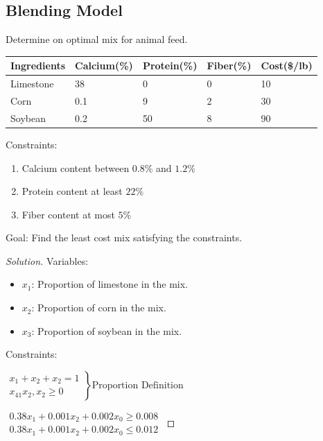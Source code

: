 \documentclass[11pt]{article}
\numberwithin{equation}{section}
\newenvironment{solution}
  {\renewcommand\qedsymbol{$\blacksquare$}\begin{proof}[Solution]}
  {\end{proof}}
\begin{document}
\subsection{Blending Model}
\begin{example}
    Determine on optimal mix for animal feed.

    \vspace{5mm}
    \begin{tabular}{|l|llll|}
        \hline
        Ingredients & Calcium(\%) & Protein(\%) & Fiber(\%) & Cost(\$/lb) \\ \hline
        Limestone   & 38          & 0           & 0         & 10          \\
        Corn        & 0.1         & 9           & 2         & 30          \\
        Soybean     & 0.2         & 50          & 8         & 90          \\ \hline
    \end{tabular}
    \vspace{5mm}
    
    Constraints:
    \begin{enumerate}[1)]
        \item Calcium content between $0.8\%$ and $1.2\%$
        \item Protein content at least $22\%$
        \item Fiber content at most $5\%$
    \end{enumerate}
    Goal: Find the least cost mix satisfying the constraints.

    \begin{solution}
        Variables:
        \begin{itemize}
            \item $x_1$: Proportion of limestone in the mix.
            \item $x_2$: Proportion of corn in the mix.
            \item $x_3$: Proportion of soybean in the mix.
        \end{itemize}
        Constraints:

        $\left.\begin{array}{l}
            x_{1}+x_{2}+x_{2}=1 \\
            x_{41} x_{2}, x_{2} \geqslant 0
            \end{array}\right\} \text{Proportion Definition}$
            
        $\begin{array}{l}
            0.38 x_{1}+0.001 x_{2}+0.002 x_{0} \geqslant 0.008 \\
            0.38 x_{1}+0.001 x_{2}+0.002 x_{0} \leqslant 0.012
            \end{array}$
    \end{solution}
\end{example}
\end{document}
